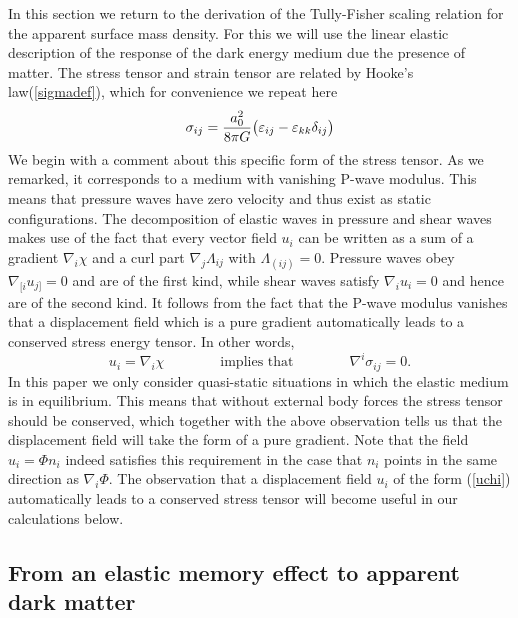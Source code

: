 \documentclass[a4paper,12pt]{article}
\newcommand{\be}{\begin{equation}}
\newcommand{\ee}{\end{equation}}
\begin{document}
In this section we return to the derivation of the Tully-Fisher scaling relation for the apparent surface mass density. For this we will use the linear elastic description of the response of the dark energy medium due the presence of matter. The stress tensor and strain tensor are related by Hooke's law(\ref{sigmadef}), which for convenience we repeat here
\be
\label{sigmadef2}
\sigma_{ij}  = {a_0^2\over 8\pi G}\bigl(\varepsilon_{ij}- \varepsilon_{kk}\delta_{ij}\bigr)
\ee
We begin with a comment about this specific form of the stress tensor. As we remarked, it corresponds to a medium with vanishing P-wave modulus. This means that pressure waves have zero velocity and thus exist as static configurations.  The decomposition of elastic waves in pressure and shear waves makes use of the fact that every vector field $u_i$ can be written as a sum of a gradient $\nabla_i\chi$ and a curl part $\nabla_j \Lambda_{ij}$ with $\Lambda_{(ij)}=0$.  Pressure waves obey $\nabla_{[i} u_{j]}=0$ and are of the first kind, while shear waves satisfy $\nabla_i u_i=0$ and  hence are of the second kind.   It follows from the fact that the P-wave modulus vanishes that a displacement field which is a pure gradient automatically leads to a conserved stress energy tensor. In other words, 
\begin{equation}
\label{uchi}
u_i =\nabla_i\chi \qquad\qquad\mbox{implies that}\qquad \qquad \nabla^i\sigma_{ij} =0.
\end{equation}
In this paper we only consider quasi-static situations in which the elastic medium is in equilibrium.  This means that without external body forces the stress tensor should be conserved, which together with the above observation tells us that the displacement field will take the form of a pure gradient. Note that the field $u_i= \Phi n_i$ indeed satisfies this requirement in the case that $n_i$ points in the same direction as $\nabla_i\Phi$.   The observation that  a displacement field $u_i$ of the form (\ref{uchi}) automatically leads to a conserved stress tensor  will become useful in our calculations below. 

\subsection{From an elastic memory effect to apparent dark matter}


\end{document}
